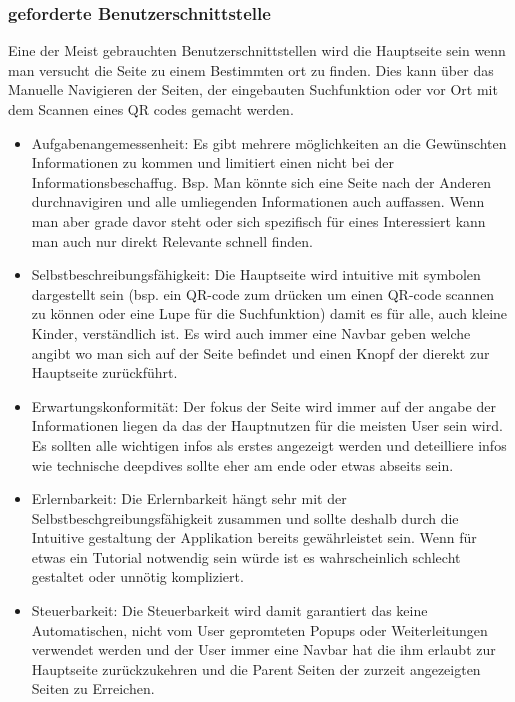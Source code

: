 \documentclass[10pt]{article}
\begin{document}
	\subsubsection[geforderte Benutzerschnittstelle]{geforderte Benutzerschnittstelle}
	Eine der Meist gebrauchten Benutzerschnittstellen wird die Hauptseite sein wenn man versucht die Seite zu einem Bestimmten ort zu finden. Dies kann über das Manuelle Navigieren der Seiten, der eingebauten Suchfunktion oder vor Ort mit dem Scannen eines QR codes gemacht werden.
	\begin{itemize}
		\item Aufgabenangemessenheit: Es gibt mehrere möglichkeiten an die Gewünschten Informationen zu kommen und limitiert einen nicht bei der Informationsbeschaffug. Bsp. Man könnte sich eine Seite nach der Anderen durchnavigiren und alle umliegenden Informationen auch auffassen. Wenn man aber grade davor steht oder sich spezifisch für eines Interessiert kann man auch nur direkt Relevante schnell finden.
		
		\item Selbstbeschreibungsfähigkeit: Die Hauptseite wird intuitive mit symbolen dargestellt sein (bsp. ein QR-code zum drücken um einen QR-code scannen zu können oder eine Lupe für die Suchfunktion) damit es für alle, auch kleine Kinder, verständlich ist. Es wird auch immer eine Navbar geben welche angibt wo man sich auf der Seite befindet und einen Knopf der dierekt zur Hauptseite zurückführt.
		
		\item Erwartungskonformität: Der fokus der Seite wird immer auf der angabe der Informationen liegen da das der Hauptnutzen für die meisten User sein wird. Es sollten alle wichtigen infos als erstes angezeigt werden und deteilliere infos wie technische deepdives sollte eher am ende oder etwas abseits sein.
		
		\item Erlernbarkeit: Die Erlernbarkeit hängt sehr mit der Selbstbeschgreibungsfähigkeit zusammen und sollte deshalb durch die Intuitive gestaltung der Applikation bereits gewährleistet sein. Wenn für etwas ein Tutorial notwendig sein würde ist es wahrscheinlich schlecht gestaltet oder unnötig kompliziert.
		
		\item Steuerbarkeit: Die Steuerbarkeit wird damit garantiert das keine Automatischen, nicht vom User gepromteten Popups oder Weiterleitungen verwendet werden und der User immer eine Navbar hat die ihm erlaubt zur Hauptseite zurückzukehren und die Parent Seiten der zurzeit angezeigten Seiten zu Erreichen.
		

\end{itemize}
\end{document}
